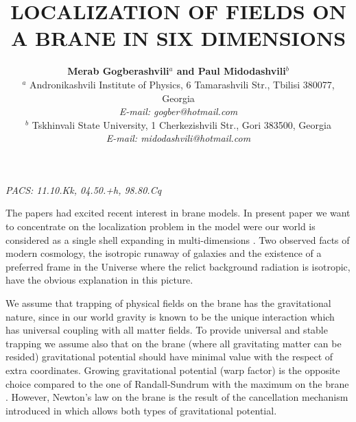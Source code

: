 \documentclass[a4paper,a4paper]{article}
\begin{document}
\title{\large \bf LOCALIZATION OF FIELDS ON A BRANE IN SIX DIMENSIONS}
\author{{\bf Merab Gogberashvili$^a$ and Paul Midodashvili$^b$} \\
$^a$ Andronikashvili Institute of Physics, 6 Tamarashvili Str.,
Tbilisi 380077, Georgia \\
{\sl E-mail: gogber@hotmail.com }\\
$^b$ Tskhinvali State University, 1 Cherkezishvili Str.,
Gori 383500, Georgia \\
{\sl E-mail: midodashvili@hotmail.com } }
\maketitle
\begin{abstract}
\end{abstract}
\vskip 0.3cm {\sl PACS: 11.10.Kk, 04.50.+h, 98.80.Cq}
\vskip 0.5cm

The papers \cite{ADD,RaSu,G1} had excited recent interest in brane
models. In present paper we want to concentrate on the 
localization problem in the model were our world is considered as
a single shell expanding in multi-dimensions
\cite{G2,G3,G4,G5,GoMi}. Two observed facts of modern cosmology,
the isotropic runaway of galaxies and the existence of a preferred
frame in the Universe where the relict background radiation is
isotropic, have the obvious explanation in this picture.

We assume that trapping of physical fields on the brane has the
gravitational nature, since in our world gravity is known to be
the unique interaction which has universal coupling with all
matter fields. To provide universal and stable trapping we assume
also that on the brane (where all gravitating matter can be
resided) gravitational potential should have minimal value with
the respect of extra coordinates. Growing gravitational potential
(warp factor) is the opposite choice compared to the one of
Randall-Sundrum with the maximum on the brane \cite{RaSu}.
However, Newton's law on the brane is the result of the
cancellation mechanism introduced in \cite{G1,G4} which allows
both types of gravitational potential.
\end{document}
